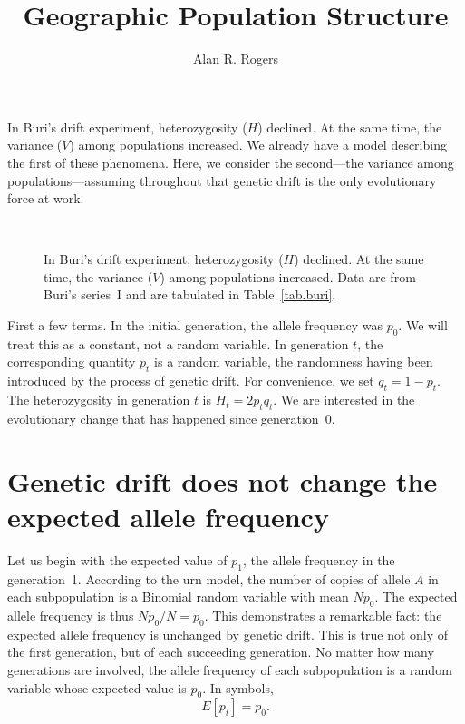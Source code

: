 \documentclass[twocolumn]{article}
\begin{document}
\title{Geographic Population Structure}
\author{Alan R. Rogers}
\maketitle

In Buri's \citep{Buri:E-10-367} drift experiment, heterozygosity ($H$)
declined.  At the same time, the variance ($V$) among populations
increased.  We already have a model describing the first of these
phenomena.  Here, we consider the second---the variance among
populations---assuming throughout that genetic drift is the only
evolutionary force at work.

\begin{figure}
{\centering\\}
\caption{In Buri's \citep{Buri:E-10-367} drift experiment,
  heterozygosity ($H$) declined.  At the same time, the variance ($V$)
  among populations increased.  Data are from Buri's series~I and are
  tabulated in Table~\ref{tab.buri}.}
  \label{fig.buri}
\end{figure}

First a few terms.  In the initial generation, the allele frequency
was $p_0$.  We will treat this as a constant, not a random variable.
In generation $t$, the corresponding quantity $p_t$ is a random
variable, the randomness having been introduced by the process of
genetic drift.  For convenience, we set $q_t = 1-p_t$.  The
heterozygosity in generation $t$ is $H_t = 2p_t q_t$.  We are
interested in the evolutionary change that has happened since
generation~0.

\section{Genetic drift does not change the expected allele 
frequency} 

Let us begin with the expected value of $p_1$, the allele frequency in
the generation~1.  According to the urn model, the number of copies of
allele $A$ in each subpopulation is a Binomial random variable with
mean $Np_0$.  The expected allele frequency is thus $Np_0/N = p_0$.
This demonstrates a remarkable fact: the expected allele frequency is
unchanged by genetic drift.  This is true not only of the first
generation, but of each succeeding generation.  No matter how many
generations are involved, the allele frequency of each subpopulation
is a random variable whose expected value is $p_0$.  In symbols,
\begin{equation}
E[p_t] = p_0.
\label{eq.Ept}
\end{equation}
\end{document}
